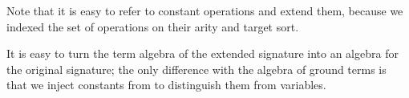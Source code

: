 \noindent Note that it is easy to refer to constant operations and
extend them, because we indexed the set of operations on their arity
and target sort.

It is easy to turn the term algebra of the extended signature into an
algebra for the original signature; the only difference with the
algebra of ground terms is that we inject constants from 
to distinguish them from variables.

\begin{code}
\>[2]\AgdaSpace{}%
\AgdaSymbol{:}%
\>[11]\AgdaSpace{}%
\<%
\\
%
\>[2]\AgdaSpace{}%
\AgdaSymbol{=}\AgdaSpace{}%
\AgdaSpace{}%
\AgdaSymbol{\{}%
\>[550I]\AgdaSpace{}%
\AgdaSymbol{=}\AgdaSpace{}%
\AgdaSpace{}%
\<%
\\
\>[.][@{}l@{}]\<[550I]%
\>[19]\AgdaSymbol{;}\AgdaSpace{}%
\AgdaSpace{}%
\AgdaSymbol{=}%
\>[556I]\AgdaSpace{}%
\AgdaSymbol{\{}\AgdaSpace{}%
\AgdaSymbol{\{}\AgdaInductiveConstructor{[]}\AgdaSymbol{\}}\AgdaSpace{}%
\AgdaSymbol{\{}\AgdaSymbol{\}}\AgdaSpace{}%
\AgdaSpace{}%
\AgdaSpace{}%
\AgdaSpace{}%
\AgdaSpace{}%
\AgdaSpace{}%
\AgdaSpace{}%
\<%
\\
\>[556I][@{}l@{\AgdaIndent{0}}]%
\>[30]\AgdaSymbol{;}\AgdaSpace{}%
\AgdaSymbol{\{}\AgdaSpace{}%
\AgdaSpace{}%
\AgdaSymbol{\}}\AgdaSpace{}%
\AgdaSymbol{\{}\AgdaSymbol{\}}\AgdaSpace{}%
\AgdaSpace{}%
\AgdaSpace{}%
\AgdaSpace{}%
\AgdaSpace{}%
\AgdaSpace{}%
\AgdaSpace{}%
\AgdaSymbol{\}}\<%
\\
%
\>[19]\AgdaSymbol{\}}\<%
\\
\>[2][@{}l@{\AgdaIndent{0}}]%
\>[4]\AgdaSpace{}%
\AgdaSpace{}%
\AgdaSpace{}%
\AgdaSymbol{(}\AgdaSymbol{)}\<%
\end{code}

